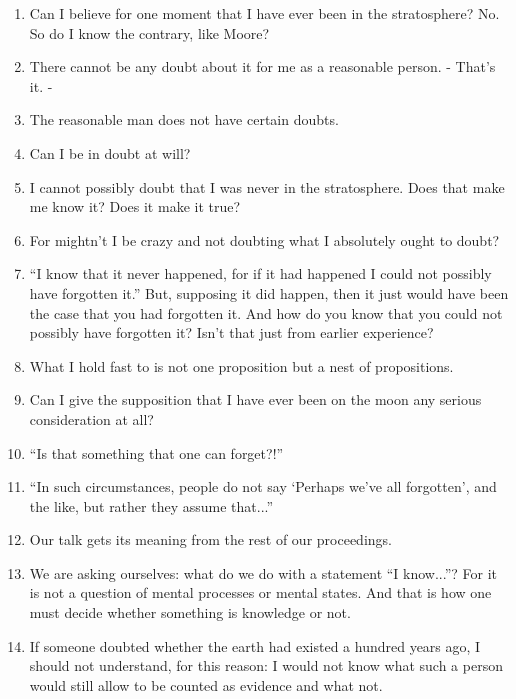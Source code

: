 \documentclass{book}
\begin{document}
\begin{enumerate}
\item
Can I believe for one moment that I have ever been in the stratosphere? No. So
do I know the contrary, like Moore?

\item
There cannot be any doubt about it for me as a reasonable person. - That's it.
-

\item
The reasonable man does not have certain doubts.

\item
Can I be in doubt at will?

\item
I cannot possibly doubt that I was never in the stratosphere. Does that make me
know it? Does it make it true?

\item
For mightn't I be crazy and not doubting what I absolutely ought to doubt?

\item
``I know that it never happened, for if it had happened I could not possibly
have forgotten it.'' But, supposing it did happen, then it just would have been
the case that you had forgotten it. And how do you know that you could not
possibly have forgotten it? Isn't that just from earlier experience?

\item
What I hold fast to is not one proposition but a nest of propositions.

\item
Can I give the supposition that I have ever been on the moon any serious
consideration at all?

\item
``Is that something that one can forget?!''

\item
``In such circumstances, people do not say `Perhaps we've all forgotten', and
the like, but rather they assume that...''

\item
Our talk gets its meaning from the rest of our proceedings.

\item
We are asking ourselves: what do we do with a statement ``I know...''? For it
is not a question of mental processes or mental states.  And that is how one
must decide whether something is knowledge or not.

\item
If someone doubted whether the earth had existed a hundred years ago, I should
not understand, for this reason: I would not know what such a person would
still allow to be counted as evidence and what not.


\end{enumerate}
\end{document}
